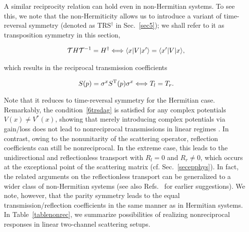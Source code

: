 \documentclass{tADP2e}
\theoremstyle{plain}
\newcommand{\eqn}[1]{
\begin{eqnarray}
	#1
\end{eqnarray}
}
\theoremstyle{plain}
\theoremstyle{definition}
\begin{document}
A similar reciprocity relation can hold even in non-Hermitian systems. To see this, we note that the non-Hermiticity allows us to introduce a variant of  time-reversal symmetry (denoted as TRS$^\dagger$ in Sec.~\ref{sec5}); we shall refer to it as transposition symmetry in this section,  
\eqn{\label{6trsdag}
{\cal T}H{\cal T}^{-1}  = H^{\dagger}\Longleftrightarrow\langle x|V|x'\rangle=\langle x'|V|x\rangle,
}
which results in the reciprocal transmission coefficients  
\eqn{
S(p)=\sigma^{x}S^{\rm T}(p)\sigma^{x}\Longleftrightarrow  T_{l}=T_{r}.
}
Note that it reduces to time-reversal symmetry for the Hermitian case. 
Remarkably, the condition~\eqref{6trsdag} is satisfied for any complex potentials $V(x)\neq V^*(x)$, showing that merely introducing complex potentials via gain/loss does not lead to nonreciprocal transmissions in linear regimes \cite{AZ01,JGM04}. In contrast, owing to the nonunitarity of the scattering operator, reflection coefficients can still be nonreciprocal. In the extreme case, this leads to the unidirectional and reflectionless transport with $R_l=0$ and $R_r\neq 0$, which occurs at the exceptional point of the scattering matrix (cf. Sec.~\ref{secepphys}). In fact, the related arguments on the reflectionless transport can be generalized to a wider class of non-Hermitian systems \cite{Longhi:15,HSAR15} (see also Refs.~\cite{PL96,MK05} for earlier suggestions). 
We note, however, that the parity symmetry leads to the equal transmission/reflection coefficients in the same manner as in Hermitian systems. In Table~\ref{tablenonrec}, we summarize possibilities of realizing nonreciprocal responses in linear two-channel scattering setups.
\end{document}

